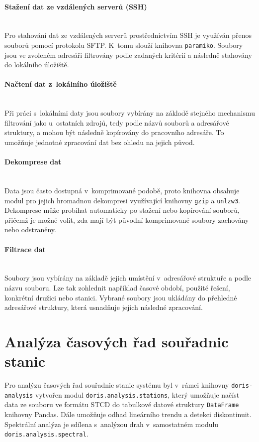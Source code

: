 \paragraph{Stažení dat ze vzdálených serverů (SSH)}\leavevmode\\
Pro stahování dat ze vzdálených serverů prostřednictvím SSH je využíván přenos souborů pomocí protokolu SFTP. K~tomu slouží knihovna \texttt{paramiko}. Soubory jsou ve zvoleném adresáři filtrovány podle zadaných kritérií a následně stahovány do lokálního úložiště.

\paragraph{Načtení dat z~lokálního úložiště}\leavevmode\\
Při práci s~lokálními daty jsou soubory vybírány na základě stejného mechanismu filtrování jako u~ostatních zdrojů, tedy podle názvů souborů a adresářové struktury, a mohou být následně kopírovány do pracovního adresáře. To umožňuje jednotné zpracování dat bez ohledu na jejich původ.

\paragraph{Dekomprese dat}\leavevmode\\
Data jsou často dostupná v~komprimované podobě, proto knihovna obsahuje modul pro jejich hromadnou dekompresi využívající knihovny \texttt{gzip} a \texttt{unlzw3}. Dekomprese může probíhat automaticky po stažení nebo kopírování souborů, přičemž je možné volit, zda mají být původní komprimované soubory zachovány nebo odstraněny.

\paragraph{Filtrace dat}\leavevmode\\
Soubory jsou vybírány na základě jejich umístění v~adresářové struktuře a podle názvu souboru. Lze tak zohlednit například časové období, použité řešení, konkrétní družici nebo stanici. Vybrané soubory jsou ukládány do přehledné adresářové struktury, která usnadňuje jejich následné zpracování.

\section{Analýza časových řad souřadnic stanic}

\begin{sloppypar}
Pro analýzu časových řad souřadnic stanic systému  byl v~rámci knihovny \texttt{doris-analysis} vytvořen modul \texttt{doris.analysis.stations}, který umožňuje načíst data ze souboru ve formátu STCD do tabulkové datové struktury \texttt{DataFrame} knihovny Pandas. Dále umožňuje odhad lineárního trendu a detekci diskontinuit. Spektrální analýza je sdílena s~analýzou drah v~samostatném modulu \texttt{doris.analysis.spectral}.
\end{sloppypar}

